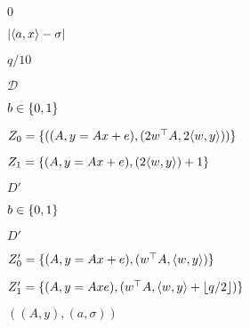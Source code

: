 \documentclass[10pt]{book}
\begin{document}
\begin{mdSnippets}
\begin{mdInlineSnippet}
$0$\end{mdInlineSnippet}%
\begin{mdInlineSnippet}[04ad110566f99888273a9196baa6135f]%
$|\langle a,x \rangle-\sigma|$\end{mdInlineSnippet}%
\begin{mdInlineSnippet}[f6e7f5f346640cf1cd084f1fb4f45491]%
$q/10$\end{mdInlineSnippet}%
\begin{mdInlineSnippet}%
$\mathcal{D}$\end{mdInlineSnippet}%
\begin{mdInlineSnippet}[6892f7e7c3b8ecc19e4a077e82515567]%
$b \in \{0,1\}$\end{mdInlineSnippet}%
\begin{mdInlineSnippet}%
$Z_0 = \{((A,y = Ax + e),(2w^\top A, 2\langle w,y \rangle)) \}$\end{mdInlineSnippet}%
\begin{mdInlineSnippet}[d5325612fc5c024def13fd5b03ad6f24]%
$Z_1 = \{(A, y = Ax + e),(2 \langle w,y \rangle) + 1 \}$\end{mdInlineSnippet}%
\begin{mdInlineSnippet}[0232f27be40b2b647f260050dd308eb8]%
$D'$\end{mdInlineSnippet}%
\begin{mdInlineSnippet}[6892f7e7c3b8ecc19e4a077e82515567]%
$b \in \{0,1\}$\end{mdInlineSnippet}%
\begin{mdInlineSnippet}[0232f27be40b2b647f260050dd308eb8]%
$D'$\end{mdInlineSnippet}%
\begin{mdInlineSnippet}[fa8f30df309fb868491817afa9e2b492]%
$Z_0' = \{(A,y= Ax + e),(w^{\top}A, \langle w,y \rangle) \}$\end{mdInlineSnippet}%
\begin{mdInlineSnippet}%
$Z_1' = \{(A, y = Ax e),(w^\top A, \langle w,y \rangle + \lfloor q/2 \rfloor) \}$\end{mdInlineSnippet}%
\begin{mdInlineSnippet}[44b7cb8db2afad00a6f188240f5cb5c2]%
$((A,y),(a,\sigma))$\end{mdInlineSnippet}%

\end{mdSnippets}
\end{document}
